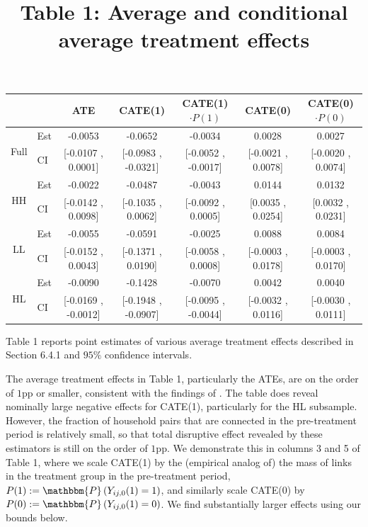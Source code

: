 \documentclass[12pt]{article}
\theoremstyle{definition}
\begin{document}
\begin{table}[htbp]
  \centering
  \title{Table 1: Average and conditional average treatment effects} 
  \footnotesize
	\hspace*{-1.2cm}
    \begin{tabular}{clccccc}
	    \hline\hline
	          &       & ATE   & CATE(1) &  CATE(1)$\cdot P(1)$     & CATE(0) &  CATE(0)$\cdot P(0)$\\
	          \midrule
	    \multirow{2}[1]{*}{Full} & Est   & -0.0053 & -0.0652 & -0.0034 & 0.0028 & 0.0027 \\
	          & CI    & [-0.0107 , 0.0001] & [-0.0983 , -0.0321] & [-0.0052 , -0.0017] & [-0.0021 , 0.0078] & [-0.0020 , 0.0074] \\
	    \multirow{2}[0]{*}{HH} & Est   & -0.0022 & -0.0487 & -0.0043 & 0.0144 & 0.0132 \\
	          & CI    & [-0.0142 , 0.0098] & [-0.1035 , 0.0062] & [-0.0092 , 0.0005] & [0.0035 , 0.0254] & [0.0032 , 0.0231] \\
	    \multirow{2}[0]{*}{LL} & Est   & -0.0055 & -0.0591 & -0.0025 & 0.0088 & 0.0084 \\
	          & CI    & [-0.0152 , 0.0043] & [-0.1371 , 0.0190] & [-0.0058 , 0.0008] & [-0.0003 , 0.0178] & [-0.0003 , 0.0170] \\
	    \multirow{2}[0]{*}{HL} & Est   & -0.0090 & -0.1428 & -0.0070 & 0.0042 & 0.0040 \\
	          & CI    & [-0.0169 , -0.0012] & [-0.1948 , -0.0907] & [-0.0095 , -0.0044] & [-0.0032 , 0.0116] & [-0.0030 , 0.0111] \\
	    \hline\hline
    \end{tabular}%
	\begin{flushleft} \footnotesize \linespread{.75} Table 1 reports point estimates of various average treatment effects described in Section 6.4.1 and $95\%$ confidence intervals. \normalsize \end{flushleft}
\end{table}%

The average treatment effects in Table 1, particularly the ATEs, are on the order of $1$pp or smaller, consistent with the findings of \cite{banerjee2021changes}. The table does reveal nominally large negative effects for CATE(1), particularly for the HL subsample. However, the fraction of household pairs that are connected in the pre-treatment period is relatively small, so that total disruptive effect revealed by these estimators is still on the order of $1$pp. We demonstrate this in columns 3 and 5 of Table 1, where we scale CATE(1) by the (empirical analog of) the mass of links in the treatment group in the pre-treatment period,  $P(1) := \mathbbm{P}\left(Y_{ij,0}(1) = 1\right)$, and similarly scale CATE(0) by $P(0) := \mathbbm{P}\left(Y_{ij,0}(1) = 0\right)$.  We find substantially larger effects using our bounds below.      
\end{document}
